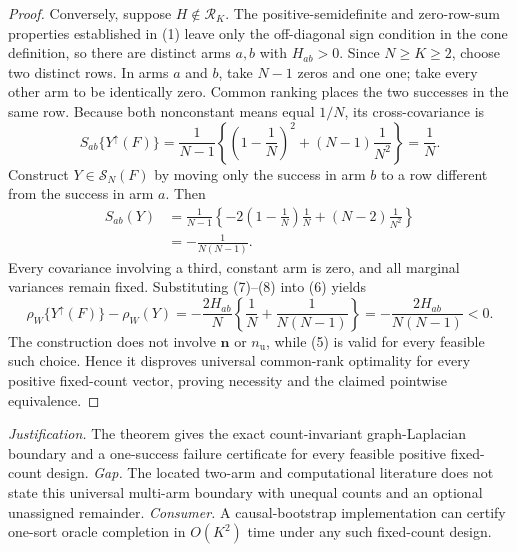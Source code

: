 \documentclass{article}
\begin{document}
\begin{proof}
Conversely, suppose \(H\notin\mathcal R_K\).  The positive-semidefinite and zero-row-sum properties established in (1) leave only the off-diagonal sign condition in the cone definition, so there are distinct arms \(a,b\) with \(H_{ab}>0\).  Since \(N\geq K\geq2\), choose two distinct rows.  In arms \(a\) and \(b\), take \(N-1\) zeros and one one; take every other arm to be identically zero.  Common ranking places the two successes in the same row.  Because both nonconstant means equal \(1/N\), its cross-covariance is
\[
S_{ab}\{Y^{\uparrow}(F)\}
=\frac1{N-1}\left\{\left(1-\frac1N\right)^2
+(N-1)\frac1{N^2}\right\}=\frac1N. \tag{7}
\]
Construct \(Y\in\mathcal S_N(F)\) by moving only the success in arm \(b\) to a row different from the success in arm \(a\).  Then
\[
\begin{aligned}
S_{ab}(Y)
&=\frac1{N-1}\left\{-2\left(1-\frac1N\right)\frac1N
+(N-2)\frac1{N^2}\right\}\\
&=-\frac1{N(N-1)}. \tag{8}
\end{aligned}
\]
Every covariance involving a third, constant arm is zero, and all marginal variances remain fixed.  Substituting (7)--(8) into (6) yields
\[
\rho_W\{Y^{\uparrow}(F)\}-\rho_W(Y)
=-\frac{2H_{ab}}N\left\{\frac1N+\frac1{N(N-1)}\right\}
=-\frac{2H_{ab}}{N(N-1)}<0. \tag{9}
\]
The construction does not involve \(\mathbf n\) or \(n_{\mathrm u}\), while (5) is valid for every feasible such choice.  Hence it disproves universal common-rank optimality for every positive fixed-count vector, proving necessity and the claimed pointwise equivalence.
\end{proof}
\par\smallskip\noindent \textit{Justification.} The theorem gives the exact count-invariant graph-Laplacian boundary and a one-success failure certificate for every feasible positive fixed-count design. \textit{Gap.} The located two-arm and computational literature does not state this universal multi-arm boundary with unequal counts and an optional unassigned remainder. \textit{Consumer.} A causal-bootstrap implementation can certify one-sort oracle completion in \(O(K^2)\) time under any such fixed-count design.
\end{document}
